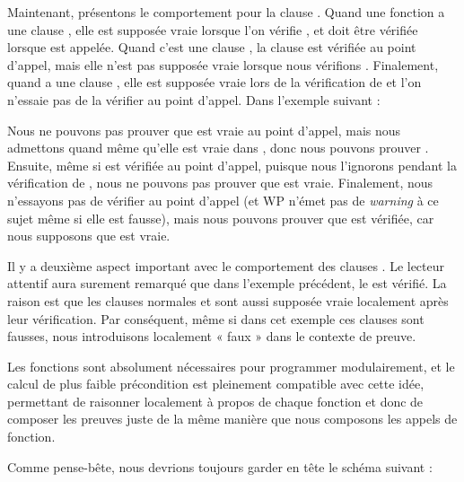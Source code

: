 Maintenant, présentons le comportement pour la clause .
Quand une fonction  a une clause , elle est
supposée vraie lorsque l'on vérifie , et doit être vérifiée
lorsque  est appelée. Quand c'est une clause
, la clause est vérifiée au point d'appel, mais elle
n'est pas supposée vraie lorsque nous vérifions . Finalement,
quand  a une clause , elle est supposée
vraie lors de la vérification de  et l'on n'essaie pas de la
vérifier au point d'appel. Dans l'exemple suivant :



Nous ne pouvons pas prouver que  est vraie au point d'appel, mais
nous admettons quand même qu'elle est vraie dans , donc nous
pouvons prouver . Ensuite, même si  est vérifiée
au point d'appel, puisque nous l'ignorons pendant la vérification de
, nous ne pouvons pas prouver que  est vraie.
Finalement, nous n'essayons pas de vérifier  au point d'appel
(et WP n'émet pas de \textit{warning} à ce sujet même si elle est fausse), mais
nous pouvons prouver que  est vérifiée, car nous supposons que
 est vraie.


Il y a deuxième aspect important avec le comportement des clauses
. Le lecteur attentif aura surement remarqué que dans
l'exemple précédent, le  est vérifié.
La raison est que les clauses  normales et
 sont aussi supposée vraie localement après leur vérification.
Par conséquent, même si dans cet exemple ces clauses sont fausses, nous
introduisons localement « faux » dans le contexte de preuve.




Les fonctions sont absolument nécessaires pour programmer modulairement, et le calcul
de plus faible précondition est pleinement compatible avec cette idée, permettant de
raisonner localement à propos de chaque fonction et donc de composer les preuves juste
de la même manière que nous composons les appels de fonction.


Comme pense-bête, nous devrions toujours garder en tête le schéma suivant :


